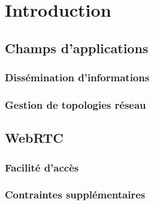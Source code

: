 
\section{Introduction}

\subsection{Champs d'applications}

\subsubsection{Dissémination d'informations}
\subsubsection{Gestion de topologies réseau}

\subsection{WebRTC}

\subsubsection{Facilité d'accès}
\subsubsection{Contraintes supplémentaires}


